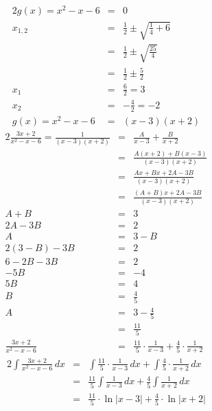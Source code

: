 \documentclass[10pt,a4paper,oneside,ngerman,numbers=noenddot]{scrartcl}
\begin{document}
\subsection{} %
\begin{alignat*}{2}
g(x) = x^{2}-x-6 &=& 0 \\
x_{1,2} &=& \frac{1}{2} \pm \sqrt{\frac{1}{4} + 6 } \\
&=& \frac{1}{2} \pm \sqrt{\frac{25}{4}} \\
&=& \frac{1}{2} \pm \frac{5}{2} \\
x_{1} &=& \frac{6}{2} = 3 \\
x_{2} &=& -\frac{4}{2} = -2 \\
g(x) = x^{2}-x-6 &=& (x-3)(x+2)
\end{alignat*}
\begin{alignat*}{2}
\frac{3x+2}{x^{2}-x-6} = \frac{1}{(x-3)(x+2)} &=& \frac{A}{x-3} + \frac{B}{x+2} \\
&=& \frac{A(x+2) + B(x-3)}{(x-3)(x+2)} \\
&=& \frac{Ax + Bx + 2A - 3B}{(x-3)(x+2)} \\
&=& \frac{(A+B)x + 2A - 3B}{(x-3)(x+2)} \\
A + B &=& 3 \\
2A - 3B &=& 2 \\
A &=& 3 - B \\
2(3-B) - 3B &=& 2 \\
6 - 2B - 3B &=& 2 \\
-5B &=& -4 \\
5B &=& 4 \\
B &=& \frac{4}{5}\\
A &=& 3 - \frac{4}{5} \\
&=& \frac{11}{5} \\
\frac{3x+2}{x^{2}-x-6} &=& \frac{11}{5} \cdot \frac{1}{x-3} + \frac{4}{5} \cdot \frac{1}{x+2}
\end{alignat*}
\begin{alignat*}{2}
\int \frac{3x+2}{x^{2}-x-6}\,dx &=& \int \frac{11}{5} \cdot \frac{1}{x-3}\,dx + \int \frac{4}{5} \cdot \frac{1}{x+2}\,dx \\
&=& \frac{11}{5} \int \frac{1}{x-3}\,dx + \frac{4}{5} \int \frac{1}{x+2}\,dx \\
&=& \frac{11}{5} \cdot \ln |x-3| + \frac{4}{5} \cdot \ln |x+2|
\end{alignat*}
\end{document}
